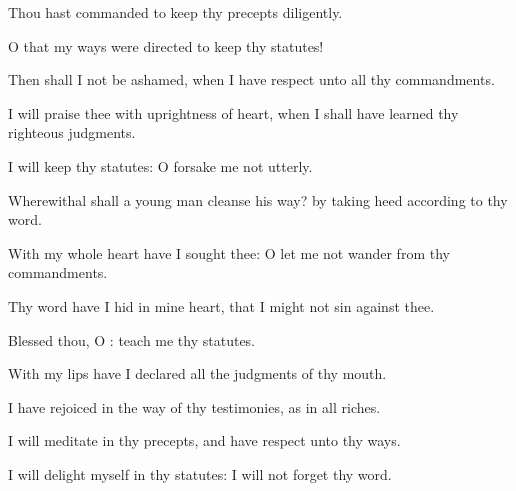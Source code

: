 {\Q {}Thou hast
commanded
{} to
keep thy
precepts
diligently.


\par }{\Q {}O
that my
ways were
directed to
keep thy
statutes!


\par }{\Q {}Then shall I not be
ashamed, when I have
respect unto all thy
commandments.


\par }{\BB \par }
{\Q {}I will
praise thee with
uprightness of
heart, when I shall have
learned thy
righteous
judgments.


\par }{\Q {}I will
keep thy
statutes: O
forsake me not
utterly.


\par }{
\par }
{\Q {}Wherewithal shall a young
man
cleanse his
way? by taking
heed
{} according to thy
word.


\par }{\Q {}With my whole
heart have I
sought thee: O let me not
wander from thy
commandments.


\par }{\Q {}Thy
word have I
hid in mine
heart, that I might not
sin against thee.


\par }{\Q {}Blessed
{} thou, O
{}:
teach me thy
statutes.


\par }{\BB \par }
{\Q {}With my
lips have I
declared all the
judgments of thy
mouth.


\par }{\Q {}I have
rejoiced in the
way of thy
testimonies, as
{}
in all
riches.


\par }{\Q {}I will
meditate in thy
precepts, and have
respect unto thy
ways.


\par }{\Q {}I will
delight myself in thy
statutes: I will not
forget thy
word.


\par }{
\par }
